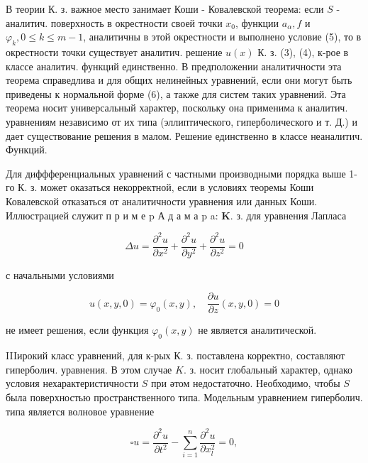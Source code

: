 \documentclass[10pt]{article}
\begin{document}
В теории К. з. важное место занимает Коши - Ковалевской теорема: если $S$ - аналитич. поверхность в окрестности своей точки $x_{0}$, функции $a_{\alpha}, f$ и $\varphi_{k}, 0 \leqslant k \leqslant m-1$, аналитичны в этой окрестности и выполнено условие (5), то в окрестности точки существует аналитич. решение $u(x)$ К. з. (3), (4), к-рое в классе аналитич. функций единственно. В предположении аналитичности эта теорема справедлива и для общих нелинейных уравнений, если они могут быть приведены к нормальной форме (6), а также для систем таких уравнений. Эта теорема носит универсальный характер, поскольку она применима к аналитич. уравнениям независимо от их типа (эллиптического, гиперболического и т. Д.) и дает существование решения в малом. Решение единственно в классе неаналитич. Функций.



Для диффференциальных уравнений с частными производными порядка выше 1-го К. з. может оказаться некорректной, если в условиях теоремы Коши Ковалевской отказаться от аналитичности уравнения или данных Коши. Иллюстрацией служит п р и м е p А д а м а p a: $\mathbf{K}$. з. для уравнения Лапласа



\[

\Delta u=\frac{\partial^{2} u}{\partial x^{2}}+\frac{\partial^{2} u}{\partial y^{2}}+\frac{\partial^{2} u}{\partial z^{2}}=0

\]



с начальными условиями



\[

u(x, y, 0)=\varphi_{0}(x, y), \quad \frac{\partial u}{\partial z}(x, y, 0)=0

\]



не имеет решения, если функция $\varphi_{0}(x, y)$ не является аналитической.



IIIирокий класс уравнений, для к-рых К. з. поставлена корректно, составляют гиперболич. уравнения. В этом случае $K$. з. носит глобальный характер, однако условия нехарактеристичности $S$ при әтом недостаточно. Необходимо, чтобы $S$ была поверхностью пространственного типа. Модельным уравнением гиперболич. типа является волновое уравнение



\[

\square u=\frac{\partial^{2} u}{\partial t^{2}}-\sum_{i=1}^{n} \frac{\partial^{2} u}{\partial x_{l}^{2}}=0,

\]
\end{document}
